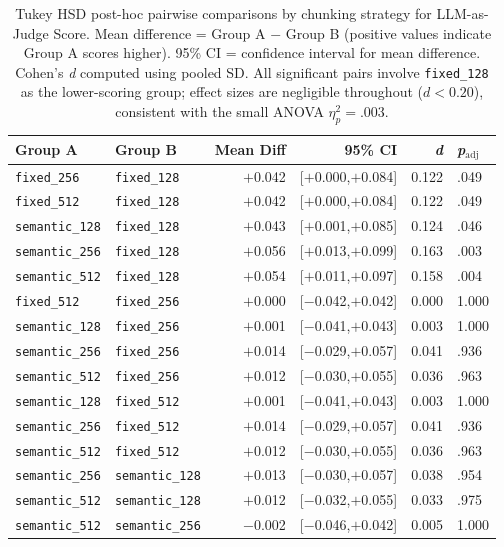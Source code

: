 \documentclass[12pt]{article}
\begin{document}
\begin{table}[h]
\centering
\caption{Tukey HSD post-hoc pairwise comparisons by chunking strategy for LLM-as-Judge Score. Mean difference = Group A $-$ Group B (positive values indicate Group A scores higher). 95\% CI = confidence interval for mean difference. Cohen's \textit{d} computed using pooled SD. All significant pairs involve \texttt{fixed\_128} as the lower-scoring group; effect sizes are negligible throughout ($d < 0.20$), consistent with the small ANOVA $\eta^2_p = .003$.}
\label{tab:tukey_strategy}
\begin{tabular}{llrrrl}
\toprule
\textbf{Group A} & \textbf{Group B} & \textbf{Mean Diff} & \textbf{95\% CI} & \textbf{\textit{d}} & \textbf{\textit{p}$_{\text{adj}}$} \\
\midrule
\texttt{fixed\_256}   & \texttt{fixed\_128}   & $+$0.042 & [$+$0.000,\hphantom{$+$}$+$0.084] & 0.122 & .049 \\
\texttt{fixed\_512}   & \texttt{fixed\_128}   & $+$0.042 & [$+$0.000,\hphantom{$+$}$+$0.084] & 0.122 & .049 \\
\texttt{semantic\_128} & \texttt{fixed\_128}  & $+$0.043 & [$+$0.001,\hphantom{$+$}$+$0.085] & 0.124 & .046 \\
\texttt{semantic\_256} & \texttt{fixed\_128}  & $+$0.056 & [$+$0.013,\hphantom{$+$}$+$0.099] & 0.163 & .003 \\
\texttt{semantic\_512} & \texttt{fixed\_128}  & $+$0.054 & [$+$0.011,\hphantom{$+$}$+$0.097] & 0.158 & .004 \\
\midrule
\texttt{fixed\_512}   & \texttt{fixed\_256}   & $+$0.000 & [$-$0.042,\hphantom{$-$}$+$0.042] & 0.000 & 1.000 \\
\texttt{semantic\_128} & \texttt{fixed\_256}  & $+$0.001 & [$-$0.041,\hphantom{$-$}$+$0.043] & 0.003 & 1.000 \\
\texttt{semantic\_256} & \texttt{fixed\_256}  & $+$0.014 & [$-$0.029,\hphantom{$-$}$+$0.057] & 0.041 & .936 \\
\texttt{semantic\_512} & \texttt{fixed\_256}  & $+$0.012 & [$-$0.030,\hphantom{$-$}$+$0.055] & 0.036 & .963 \\
\texttt{semantic\_128} & \texttt{fixed\_512}  & $+$0.001 & [$-$0.041,\hphantom{$-$}$+$0.043] & 0.003 & 1.000 \\
\texttt{semantic\_256} & \texttt{fixed\_512}  & $+$0.014 & [$-$0.029,\hphantom{$-$}$+$0.057] & 0.041 & .936 \\
\texttt{semantic\_512} & \texttt{fixed\_512}  & $+$0.012 & [$-$0.030,\hphantom{$-$}$+$0.055] & 0.036 & .963 \\
\texttt{semantic\_256} & \texttt{semantic\_128} & $+$0.013 & [$-$0.030,\hphantom{$-$}$+$0.057] & 0.038 & .954 \\
\texttt{semantic\_512} & \texttt{semantic\_128} & $+$0.012 & [$-$0.032,\hphantom{$-$}$+$0.055] & 0.033 & .975 \\
\texttt{semantic\_512} & \texttt{semantic\_256} & $-$0.002 & [$-$0.046,\hphantom{$-$}$+$0.042] & 0.005 & 1.000 \\
\bottomrule
\end{tabular}
\end{table}
 
\end{document}
